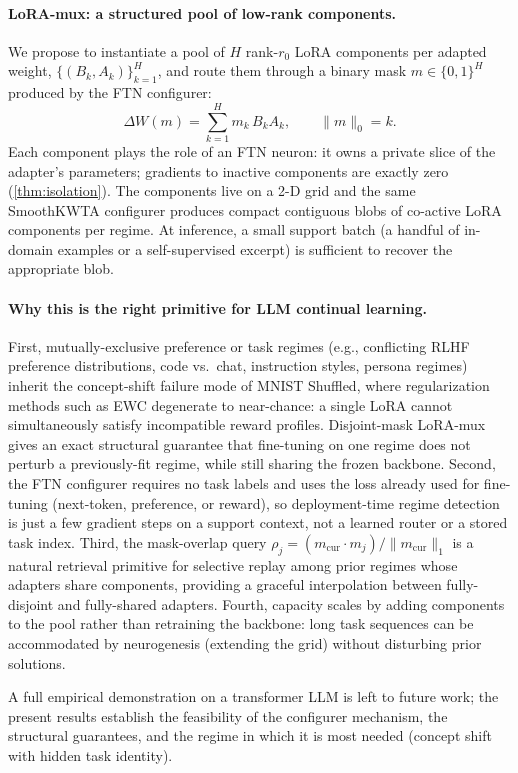 \documentclass{article}
\theoremstyle{plain}
\theoremstyle{remark}
\begin{document}
\paragraph{LoRA-mux: a structured pool of low-rank components.}
We propose to instantiate a pool of $H$ rank-$r_0$ LoRA components per adapted weight, $\{(B_k,A_k)\}_{k=1}^H$, and route them through a binary mask $m\in\{0,1\}^H$ produced by the FTN configurer:
\[
  \Delta W(m)=\sum_{k=1}^{H} m_k\,B_k A_k, \qquad \|m\|_0 = k.
\]
Each component plays the role of an FTN neuron: it owns a private slice of the adapter's parameters; gradients to inactive components are exactly zero (\cref{thm:isolation}). The components live on a 2-D grid and the same SmoothKWTA configurer produces compact contiguous blobs of co-active LoRA components per regime. At inference, a small support batch (a handful of in-domain examples or a self-supervised excerpt) is sufficient to recover the appropriate blob.

\paragraph{Why this is the right primitive for LLM continual learning.}
First, mutually-exclusive preference or task regimes (e.g., conflicting RLHF preference distributions, code vs.\ chat, instruction styles, persona regimes) inherit the concept-shift failure mode of MNIST Shuffled, where regularization methods such as EWC degenerate to near-chance: a single LoRA cannot simultaneously satisfy incompatible reward profiles. Disjoint-mask LoRA-mux gives an exact structural guarantee that fine-tuning on one regime does not perturb a previously-fit regime, while still sharing the frozen backbone. Second, the FTN configurer requires no task labels and uses the loss already used for fine-tuning (next-token, preference, or reward), so deployment-time regime detection is just a few gradient steps on a support context, not a learned router or a stored task index. Third, the mask-overlap query $\rho_j=(m_\mathrm{cur}\cdot m_j)/\|m_\mathrm{cur}\|_1$ is a natural retrieval primitive for selective replay among prior regimes whose adapters share components, providing a graceful interpolation between fully-disjoint and fully-shared adapters. Fourth, capacity scales by adding components to the pool rather than retraining the backbone: long task sequences can be accommodated by neurogenesis (extending the grid) without disturbing prior solutions.

A full empirical demonstration on a transformer LLM is left to future work; the present results establish the feasibility of the configurer mechanism, the structural guarantees, and the regime in which it is most needed (concept shift with hidden task identity).
\end{document}
